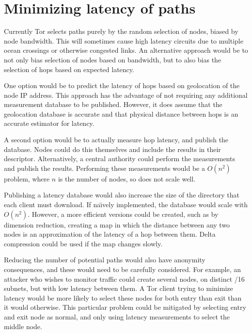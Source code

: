 \documentclass{article}
\title{\thetitle}
\author{Steven J. Murdoch}
\begin{document}
\thispagestyle{plain}
 
\maketitle

\section{Minimizing latency of paths}

Currently Tor selects paths purely by the random selection of nodes, biased by node bandwidth.
This will sometimes cause high latency circuits due to multiple ocean crossings or otherwise congested links.
An alternative approach would be to not only bias selection of nodes based on bandwidth, but to also bias the selection of hops based on expected latency.

One option would be to predict the latency of hops based on geolocation of the node IP address.
This approach has the advantage of not requiring any additional measurement database to be published.
However, it does assume that the geolocation database is accurate and that physical distance between hops is an accurate estimator for latency.

A second option would be to actually measure hop latency, and publish the database.
Nodes could do this themselves and include the results in their descriptor.
Alternatively, a central authority could perform the measurements and publish the results.
Performing these measurements would be a $O(n^2)$ problem, where $n$ is the number of nodes, so does not scale well.

Publishing a latency database would also increase the size of the directory that each client must download.
If na\"{\i}vely implemented, the database would scale with $O(n^2)$.
However, a more efficient versions could be created, such as by dimension reduction, creating a map in which the distance between any two nodes is an approximation of the latency of a hop between them.
Delta compression could be used if the map changes slowly.

Reducing the number of potential paths would also have anonymity consequences, and these would need to be carefully considered.
For example, an attacker who wishes to monitor traffic could create several nodes, on distinct /16 subnets, but with low latency between them.
A Tor client trying to minimize latency would be more likely to select these nodes for both entry than exit than it would otherwise.
This particular problem could be mitigated by selecting entry and exit node as normal, and only using latency measurements to select the middle node.
\end{document}
